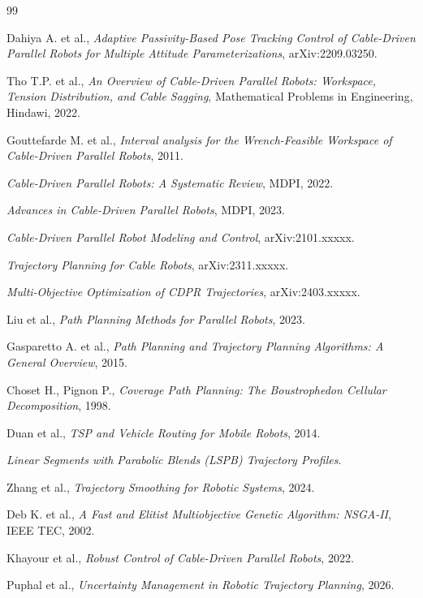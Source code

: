 \documentclass[12pt,a4paper]{report}
\begin{document}
\clearpage

% 
\begin{thebibliography}{99}

Dahiya A. et al., \textit{Adaptive Passivity-Based Pose Tracking Control of Cable-Driven Parallel Robots for Multiple Attitude Parameterizations}, arXiv:2209.03250.

Tho T.P. et al., \textit{An Overview of Cable-Driven Parallel Robots: Workspace, Tension Distribution, and Cable Sagging}, Mathematical Problems in Engineering, Hindawi, 2022.

Gouttefarde M. et al., \textit{Interval analysis for the Wrench-Feasible Workspace of Cable-Driven Parallel Robots}, 2011.

\textit{Cable-Driven Parallel Robots: A Systematic Review}, MDPI, 2022.

\textit{Advances in Cable-Driven Parallel Robots}, MDPI, 2023.

\textit{Cable-Driven Parallel Robot Modeling and Control}, arXiv:2101.xxxxx.

\textit{Trajectory Planning for Cable Robots}, arXiv:2311.xxxxx.

\textit{Multi-Objective Optimization of CDPR Trajectories}, arXiv:2403.xxxxx.

Liu et al., \textit{Path Planning Methods for Parallel Robots}, 2023.

Gasparetto A. et al., \textit{Path Planning and Trajectory Planning Algorithms: A General Overview}, 2015.

Choset H., Pignon P., \textit{Coverage Path Planning: The Boustrophedon Cellular Decomposition}, 1998.

Duan et al., \textit{TSP and Vehicle Routing for Mobile Robots}, 2014.

\textit{Linear Segments with Parabolic Blends (LSPB) Trajectory Profiles}.

Zhang et al., \textit{Trajectory Smoothing for Robotic Systems}, 2024.

Deb K. et al., \textit{A Fast and Elitist Multiobjective Genetic Algorithm: NSGA-II}, IEEE TEC, 2002.

Khayour et al., \textit{Robust Control of Cable-Driven Parallel Robots}, 2022.

Puphal et al., \textit{Uncertainty Management in Robotic Trajectory Planning}, 2026.

\end{thebibliography}

% 
% 
% 
\end{document}
